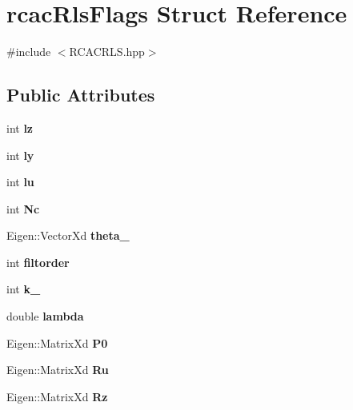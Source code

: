 \hypertarget{structrcac_rls_flags}{}\section{rcac\+Rls\+Flags Struct Reference}
\label{structrcac_rls_flags}


{\ttfamily \#include $<$R\+C\+A\+C\+R\+L\+S.\+hpp$>$}

\subsection*{Public Attributes}
\begin{DoxyCompactItemize}
\item 
\mbox{\label{structrcac_rls_flags_a778bf4d0700174efa6deeb624d5bcc09}} 
int {\bfseries lz}
\item 
\mbox{\label{structrcac_rls_flags_a760f93e6bfe4d6669d3671d4f81e814c}} 
int {\bfseries ly}
\item 
\mbox{\label{structrcac_rls_flags_a39f477577e34ebf3d444871495f197a6}} 
int {\bfseries lu}
\item 
\mbox{\label{structrcac_rls_flags_aca7ebde32128866a43a447f34e92928c}} 
int {\bfseries Nc}
\item 
\mbox{\label{structrcac_rls_flags_a8ed42f23cff0f5c333dc453597c0feee}} 
Eigen\+::\+Vector\+Xd {\bfseries theta\+\_}
\item 
\mbox{\label{structrcac_rls_flags_ad1869f6e91f05bb8c80c6559b0c93ac7}} 
int {\bfseries filtorder}
\item 
\mbox{\label{structrcac_rls_flags_a05c788f1af0d4fffffa6aea1be991b0b}} 
int {\bfseries k\+\_}
\item 
\mbox{\label{structrcac_rls_flags_abe27441b564ecfdf15fa511275742224}} 
double {\bfseries lambda}
\item 
\mbox{\label{structrcac_rls_flags_a2eace0273d4c073088e3116c9b2ddcc5}} 
Eigen\+::\+Matrix\+Xd {\bfseries P0}
\item 
\mbox{\label{structrcac_rls_flags_a77b15a161e92da2bdd00e07f6c13e3ba}} 
Eigen\+::\+Matrix\+Xd {\bfseries Ru}
\item 
\mbox{\label{structrcac_rls_flags_aeef4a3ade42d1d937f09dfaa9b8ce5ba}} 
Eigen\+::\+Matrix\+Xd {\bfseries Rz}
\end{DoxyCompactItemize}


